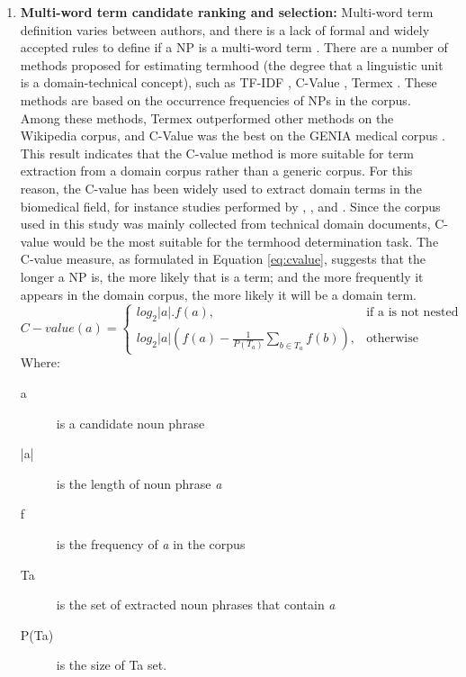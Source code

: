 \documentclass[Journal, BackFigs, DoubleSpace]{ascelike}%
\begin{document}
\begin{enumerate} [label=\roman*]
\begin{itemize}
		\item \textbf{Type 2} - Preposition noun phrases, for example `roadway type' and `type of roadway'. In order to normalize this type of variant, the form with preposition is converted into the non-preposition form by removing the preposition and reversing the order of the remaining portions. For instance, `type of roadway' will become `roadway type'.
	\end{itemize}
	Since NPs with low occurrence frequencies that are unlikely to be technical terms should be automatically eliminated. With the frequency threshold of 2, the list consists of 112,024  terms. The list size drops to 8,922 when a threshold of 50 is used. In this research we used a threshold of 50.
	\item \textbf{Multi-word term candidate ranking and selection:} Multi-word term definition varies between authors, and there is a lack of formal and widely accepted rules to define if a NP is a multi-word term \cite{frantzi20}. There are a number of methods proposed for estimating termhood (the degree that a linguistic unit is a domain-technical concept), such as TF-IDF  \cite{sparck72,salton88}, C-Value \cite{frantzi20}, Termex  \cite{sclano07}. These methods are based on the occurrence frequencies of NPs in the corpus. Among these methods, Termex outperformed other methods on the Wikipedia corpus, and C-Value was the best on the GENIA medical corpus \cite{zhang08}. This result indicates that the C-value method is more suitable for term extraction from a domain corpus rather than a generic corpus. For this reason, the C-value has been widely used to extract domain terms in the biomedical field, for instance studies performed by , , and . Since the corpus used in this study was mainly collected from technical domain documents, C-value would be the most suitable for the termhood determination task. The C-value measure, as formulated in Equation \ref{eq:cvalue}, suggests that the longer a NP is, the more likely that is a term; and the more frequently it appears in the domain corpus, the more likely it will be a domain term.
	\begin{equation}
	C-value(a)=
	\begin{cases}
	log_2|a|.f(a), & \text{if a is not nested} \\
	log_2|a|(f(a)-\frac{1}{P(T_a)}\sum_{b\in T_a} f(b)), & \text{otherwise}
	\end{cases}
	\label{eq:cvalue}
	\end{equation}
	Where:
	\begin{description}
		\item[a] is a candidate noun phrase
		\item[|a|] is the length of noun phrase \textit{a}
		\item[f] is the frequency of \textit{a} in the corpus
		\item[Ta] is the set of extracted noun phrases that contain \textit{a}
		\item[P(Ta)] is the size of Ta set.
	\end{description}
\end{enumerate}
\end{document}
